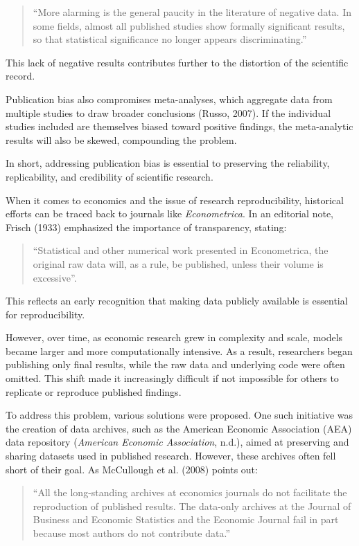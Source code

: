 \documentclass[
  a4paper,
]{article}
\begin{document}
\begin{quote}
``More alarming is the general paucity in the literature of negative
data. In some fields, almost all published studies show formally
significant results, so that statistical significance no longer appears
discriminating.''
\end{quote}

This lack of negative results contributes further to the distortion of
the scientific record.

Publication bias also compromises meta-analyses, which aggregate data
from multiple studies to draw broader conclusions (Russo, 2007). If the
individual studies included are themselves biased toward positive
findings, the meta-analytic results will also be skewed, compounding the
problem.

In short, addressing publication bias is essential to preserving the
reliability, replicability, and credibility of scientific research.

When it comes to economics and the issue of research reproducibility,
historical efforts can be traced back to journals like
\emph{Econometrica}. In an editorial note, Frisch (1933) emphasized the
importance of transparency, stating:

\begin{quote}
``Statistical and other numerical work presented in Econometrica, the
original raw data will, as a rule, be published, unless their volume is
excessive''.
\end{quote}

This reflects an early recognition that making data publicly available
is essential for reproducibility.

However, over time, as economic research grew in complexity and scale,
models became larger and more computationally intensive. As a result,
researchers began publishing only final results, while the raw data and
underlying code were often omitted. This shift made it increasingly
difficult if not impossible for others to replicate or reproduce
published findings.

To address this problem, various solutions were proposed. One such
initiative was the creation of data archives, such as the American
Economic Association (AEA) data repository (\emph{American {Economic
Association}}, n.d.), aimed at preserving and sharing datasets used in
published research. However, these archives often fell short of their
goal. As McCullough et al. (2008) points out:

\begin{quote}
``All the long-standing archives at economics journals do not facilitate
the reproduction of published results. The data-only archives at the
Journal of Business and Economic Statistics and the Economic Journal
fail in part because most authors do not contribute data.''
\end{quote}
\end{document}
